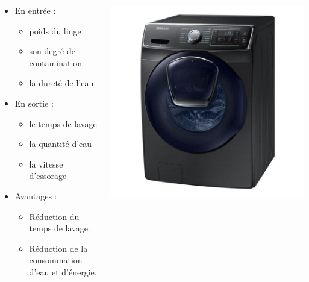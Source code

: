 \documentclass[aspectratio=169,professionalfonts, 12pt]{beamer}
\begin{document}
\begin{frame}
  \begin{columns}[T] 

    \begin{column}{.5\textwidth}
      
			\begin{itemize}
				\item En entrée :
				\begin{itemize}
					\item poids du linge
					\item son degré de contamination
					\item la dureté de l'eau
				\end{itemize}
      \end{itemize}
      
      \begin{itemize}
				\item En sortie :
				\begin{itemize}
					\item le temps de lavage
					\item la quantité d’eau
					\item la vitesse d'essorage
				\end{itemize}
      \end{itemize}
         
      \begin{itemize}
        \item Avantages :
				\begin{itemize}
					\item Réduction du temps de lavage.
					\item Réduction de la consommation d'eau et d'énergie.
				\end{itemize}
      \end{itemize}
      
    \end{column}   

		\begin{column}{.5\textwidth} 
			\includegraphics[height=0.9\textwidth]{images/machine.jpg}
    \end{column} 


\end{columns}
\end{frame}
\end{document}
